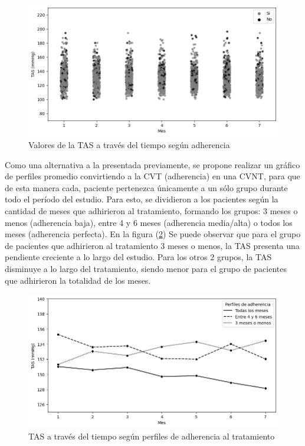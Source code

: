 \documentclass[spanish]{article}
\numberwithin{figure}{subsection}
\numberwithin{equation}{subsection}
\numberwithin{table}{subsection}
\begin{document}
\begin{figure}[H]
	\centering
	\includegraphics[scale=0.5]{img/TAS_vs_tpo_with_adherencia_scatter.png}
	\caption{Valores de la TAS a través del tiempo según adherencia}
	\label{TAS_with_adh_scatter}
\end{figure}

Como una alternativa a la presentada previamente, se propone realizar un gráfico
de perfiles promedio convirtiendo a la CVT (adherencia) en una CVNT, para que de
esta manera cada, paciente pertenezca únicamente a un sólo grupo durante todo el
período del estudio. Para esto, se dividieron a los pacientes según la cantidad
de meses que adhirieron al tratamiento, formando los grupos: 3 meses o menos
(adherencia baja), entre 4 y 6 meses (adherencia media/alta) o todos los meses
(adherencia perfecta). En la figura (\ref{TAS_with_adh}) Se puede observar que
para el grupo de pacientes que adhirieron al tratamiento 3 meses o menos, la TAS
presenta una pendiente creciente a lo largo del estudio. Para los otros 2
grupos, la TAS disminuye a lo largo del tratamiento, siendo menor para el grupo
de pacientes que adhirieron la totalidad de los meses.

\begin{figure}[H]
	\centering
	\includegraphics[scale=0.5]{img/TAS_vs_tpo_with_adherencia.png}
	\caption{TAS a través del tiempo según perfiles de adherencia al tratamiento}
	\label{TAS_with_adh}
\end{figure}
\end{document}
